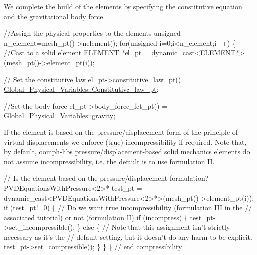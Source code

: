 We complete the build of the elements by specifying the constitutive equation and the gravitational body force.


\begin{DoxyCodeInclude}


 \textcolor{comment}{//Assign the physical properties to the elements}
 \textcolor{keywordtype}{unsigned} n\_element=mesh\_pt()->nelement();
 \textcolor{keywordflow}{for}(\textcolor{keywordtype}{unsigned} i=0;i<n\_element;i++)
  \{
   \textcolor{comment}{//Cast to a solid element}
   ELEMENT *el\_pt = \textcolor{keyword}{dynamic\_cast<}ELEMENT*\textcolor{keyword}{>}(mesh\_pt()->element\_pt(i));
   
   \textcolor{comment}{// Set the constitutive law}
   el\_pt->constitutive\_law\_pt() =
    \hyperlink{namespaceGlobal__Physical__Variables_a2a37fb040c832ee7a086bb13bb02a100}{Global\_Physical\_Variables::Constitutive\_law\_pt};

   \textcolor{comment}{//Set the body force}
   el\_pt->body\_force\_fct\_pt() = \hyperlink{namespaceGlobal__Physical__Variables_a0777aef63372db7f91ad894c38159681}{Global\_Physical\_Variables::gravity};

\end{DoxyCodeInclude}


If the element is based on the pressure/displacement form of the principle of virtual displacements we enforce (true) incompressibility if required. Note that, by default, {\ttfamily oomph-\/lib\textquotesingle{}s} pressure/displacement-\/based solid mechanics elements do not assume incompressibility, i.\+e. the default is to use formulation II.


\begin{DoxyCodeInclude}


   \textcolor{comment}{// Is the element based on the pressure/displacement formulation?}
   PVDEquationsWithPressure<2>* test\_pt = 
    \textcolor{keyword}{dynamic\_cast<}PVDEquationsWithPressure<2>*\textcolor{keyword}{>}(mesh\_pt()->element\_pt(i));
   \textcolor{keywordflow}{if} (test\_pt!=0)
    \{
     \textcolor{comment}{// Do we want true incompressibility (formulation III in the }
     \textcolor{comment}{// associated tutorial) or not (formulation II)}
     \textcolor{keywordflow}{if} (incompress)
      \{     
       test\_pt->set\_incompressible();
      \}
     \textcolor{keywordflow}{else}
      \{
       \textcolor{comment}{// Note that this assignment isn't strictly necessary as it's the}
       \textcolor{comment}{// default setting, but it doesn't do any harm to be explicit.}
       test\_pt->set\_compressible();
      \}
    \}
  \} \textcolor{comment}{// end compressibility}

\end{DoxyCodeInclude}


